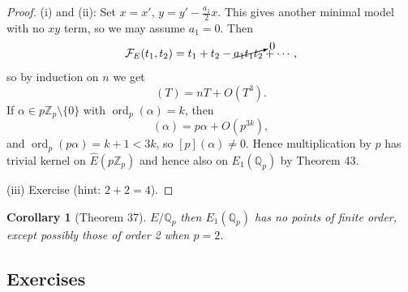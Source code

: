 \documentclass[a4paper]{article}
\newtheorem{corollary}[theorem]{Corollary}
\theoremstyle{definition}
\DeclareMathOperator{\ord}{ord}
\newcommand{\calF}{\mathcal{F}}
\newcommand{\Z}{\mathbb{Z}}
\newcommand{\Q}{\mathbb{Q}}
\begin{document}
\begin{proof}
    (i) and (ii): Set $x=x'$, $y=y'-\frac{a_1}{2}x$. This gives another minimal
    model with no $xy$ term, so we may assume $a_1=0$. Then
    \begin{equation*}
        \calF_E(t_1,t_2) = t_1+t_2 - \cancelto{0}{a_1t_1t_2} + \cdots,
    \end{equation*}
    so by induction on $n$ we get
    \begin{equation*}
        [n](T)=nT + O(T^3).
    \end{equation*}
    If $\alpha\in p\Z_p\setminus\{0\}$ with $\ord_p(\alpha)=k$, then
    \begin{equation*}
        [p](\alpha) = p\alpha + O(p^{3k}),
    \end{equation*}
    and $\ord_p(p\alpha)=k+1<3k$, so $[p](\alpha)\ne0$. Hence multiplication by
    $p$ has trivial kernel on $\hat E(p\Z_p)$ and hence also on $E_1(\Q_p)$ by
    Theorem 43.

    (iii) Exercise (hint: $2+2=4$).
\end{proof}

\begin{corollary}[Theorem 37]
    $E/\Q_p$ then $E_1(\Q_p)$ has no points of finite order, except possibly
    those of order 2 when $p=2$.
\end{corollary}

\subsection*{Exercises}
\end{document}
